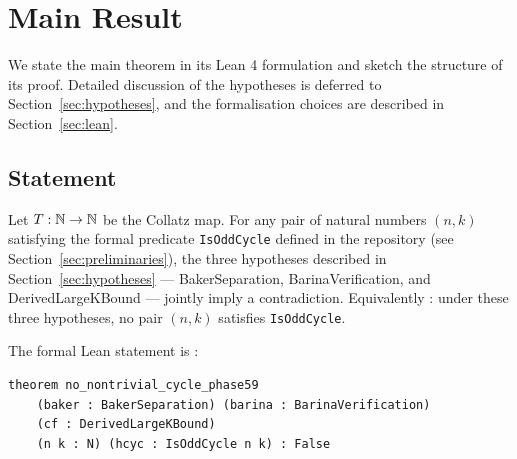 
\section{Main Result}
\label{sec:main}

We state the main theorem in its Lean 4 formulation and sketch the
structure of its proof. Detailed discussion of the hypotheses is deferred
to Section~\ref{sec:hypotheses}, and the formalisation choices are
described in Section~\ref{sec:lean}.

\subsection{Statement}

\begin{theorem}\label{thm:main}
Let \(T : \mathbb{N} \to \mathbb{N}\) be the Collatz map. For any pair of
natural numbers \((n, k)\) satisfying the formal predicate
\texttt{IsOddCycle} defined in the repository (see
Section~\ref{sec:preliminaries}), the three hypotheses described in
Section~\ref{sec:hypotheses} --- \textsf{BakerSeparation},
\textsf{BarinaVerification}, and \textsf{DerivedLargeKBound} --- jointly
imply a contradiction. Equivalently : under these three hypotheses, no
pair \((n, k)\) satisfies \texttt{IsOddCycle}.
\end{theorem}

The formal Lean statement is :

\begin{lstlisting}[caption={\texttt{no\_nontrivial\_cycle\_phase59} (\texttt{Phase59ContinuedFractions.lean}:236).}]
theorem no_nontrivial_cycle_phase59
    (baker : BakerSeparation) (barina : BarinaVerification)
    (cf : DerivedLargeKBound)
    (n k : N) (hcyc : IsOddCycle n k) : False
\end{lstlisting}

